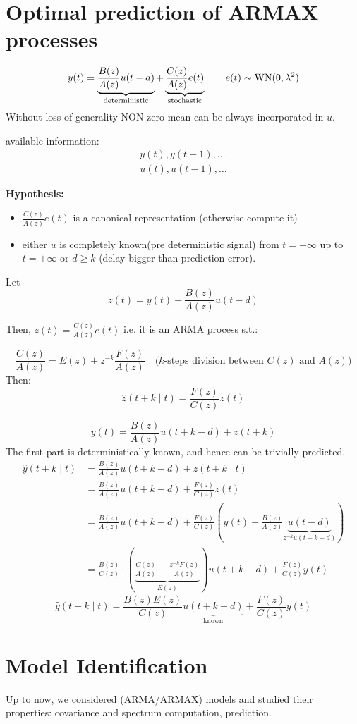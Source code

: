\section{Optimal prediction of ARMAX processes}
\[
y(t)=\underbrace{\frac{B(z)}{A(z)} u(t-a)}_{\text{deterministic}}+
\underbrace{\frac{C(z)}{A(z)} e(t)}_{\text{stochastic}}\qquad e(t)\sim \operatorname{WN}(0,\lambda^2 )
\]
Without loss of generality NON zero mean can be always incorporated in $u$.

available information:
\begin{gather*}
	y(t),y(t-1),\ldots \\
	u(t),u(t-1),\ldots
\end{gather*}

\textbf{Hypothesis:}
\begin{itemize}
	\item $\frac{C(z)}{A(z)}e(t)$  is a canonical representation (otherwise compute it)
	\item either $u$ is completely known(pre deterministic signal) from $t=-\infty$ up to $t=+\infty$ or $d\geq k$ (delay bigger than prediction error).
\end{itemize}

Let 
$$z(t)=y(t)-\frac{B(z)}{A(z)} u(t-d)$$

Then, $z(t)=\frac{C(z)}{A(z)} e(t)$ i.e. it is an ARMA process s.t.:

$$\frac{C(z)}{A(z)}=E(z)+z^{-k} \frac{F(z)}{A(z)} \quad\text{($k$-steps division between $C(z)$ and $A(z)$)}
$$
Then:
$$
\hat{z}(t+k \mid t)=\frac{F(z)}{C(z)} z(t)
$$

$$y(t)=\frac{B(z)}{A(z)} u(t+k-d)+z(t+k)$$
The first part is deterministically 
known, and hence can 
be trivially predicted.
\begin{align*}
	\hat{y}(t+k \mid t)&=\frac{B(z)}{A(z)} u(t+k-d)+z(t+k \mid t) \\
	&=\frac{B(z)}{A(z)} u(t+k-d)+\frac{F(z)}{C(z)} z(t) \\
	& =\frac{B(z)}{A(z)} u(t+k-d)+\frac{F(z)}{C(z)}\left(y(t)-\frac{B(z)}{A(z)} \underbrace{u(t-d)}_{z^{-k}u(t+k-d)}\right) \\
	&=\frac{B(z)}{C(z)} \cdot\left(\underbrace{\frac{C(z)}{A(z)}-\frac{z^{-k} F(z)}{A(z)}}_{E(z)}\right) u(t+k-d)+\frac{F(z)}{C(z)} y(t)
\end{align*}
$$
\hat{y}(t+k \mid t) =\frac{B(z) E(z)}{C(z)} \underbrace{u(t+k-d)}_{\text{known}}+\frac{F(z)}{C(z)} y(t)
$$

\section{Model Identification}
Up to now, we considered (ARMA/ARMAX) models and studied their properties: covariance and spectrum computation, 
prediction.

